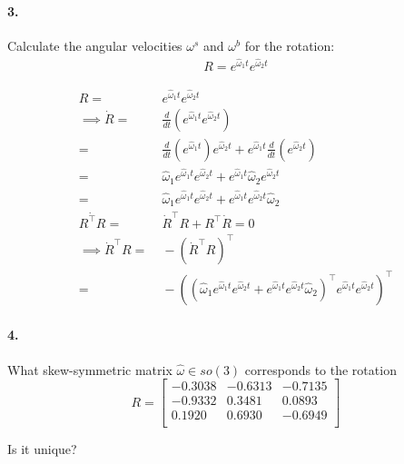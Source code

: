 \documentclass[english]{article}
\begin{document}
\paragraph{3.}

Calculate the angular velocities $\omega^s$ and $\omega^b$ for the rotation:
\begin{align}
R = e^{\hat{\omega}_1 t} e^{\hat{\omega}_2 t}
\end{align}

\begin{align*}
               R = &\;  e^{\hat{\omega}_1 t} e^{\hat{\omega}_2 t} \\
\implies \dot{R} = &\; \frac{d}{dt}(e^{\hat{\omega}_1 t} e^{\hat{\omega}_2 t}) \\
  = &\; \frac{d}{dt}(e^{\hat{\omega}_1 t}) e^{\hat{\omega}_2 t} + e^{\hat{\omega}_1 t} \frac{d}{dt}(e^{\hat{\omega}_2 t}) \\
  = &\; \hat{\omega}_1 e^{\hat{\omega}_1 t} e^{\hat{\omega}_2 t} + e^{\hat{\omega}_1 t} \hat{\omega}_2 e^{\hat{\omega}_2 t} \\
  = &\; \hat{\omega}_1 e^{\hat{\omega}_1 t} e^{\hat{\omega}_2 t} + e^{\hat{\omega}_1 t} e^{\hat{\omega}_2 t} \hat{\omega}_2 \\
 \dot{R^\top R} =&\;  \dot{R}^\top R + R^\top \dot{R} = 0 \\
\implies \dot{R}^\top R =&\;  - (\dot{R}^\top R)^\top \\
  =&\;  - (\left(\hat{\omega}_1 e^{\hat{\omega}_1 t} e^{\hat{\omega}_2 t} + e^{\hat{\omega}_1 t} e^{\hat{\omega}_2 t} \hat{\omega}_2\right)^\top e^{\hat{\omega}_1 t} e^{\hat{\omega}_2 t})^\top
\end{align*}




\paragraph{4.} 
What skew-symmetric matrix $\hat{\omega} \in so(3)$ corresponds to the rotation
\begin{equation*}
R= \begin{bmatrix}
   -0.3038 &  -0.6313 & -0.7135\\
   -0.9332  &  0.3481   & 0.0893\\
    0.1920   & 0.6930 &  -0.6949\\
\end{bmatrix}
\end{equation*}


Is it unique?

%
%
\end{document}
